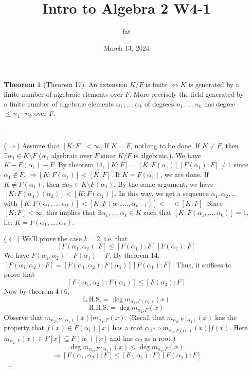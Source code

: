 \documentclass{article}
\title{Intro to Algebra 2 W4-1}
\author{fat}
\date{March 13, 2024}
\theoremstyle{definition}
\newtheorem{thm}{Theorem}
\newenvironment{proofs}[1][\proofname]{%
  \begin{proof}[#1]$ $\par\nobreak\ignorespaces
}{%
  \end{proof}
}
\begin{document}
\maketitle
\thispagestyle{fancy}
\renewcommand{\footrulewidth}{0.4pt}
\cfoot{\thepage}
\renewcommand{\headrulewidth}{0.4pt}

\begin{thm}[Theorem 17]
	An extension $K/F$ is finite $\Leftrightarrow K$ is generated by a finite number of algebraic elements over $F$.
	More precisely the field generated by a finite number of algebraic elements $\alpha_1, ..., \alpha_k$ of degrees $n_1, ..., n_k$ has degree $\leq n_1 \cdots n_k$ over $F$.
\end{thm}

\begin{proofs}
	($\Rightarrow$) Assume that $[K:F] < \infty$.
	If $K = F$, nothing to be done.
	If $K \neq F$, then $\exists \alpha_1 \in K \setminus F$ ($\alpha_1$ algebraic over $F$ since $K/F$ is algebraic.). 
	We have $K - F(\alpha_1) - F$.
	By theorem 14, $[K:F] = [K:F(\alpha_1)][F(\alpha_1):F] \neq 1$ since $\alpha_1 \notin F$.
	$\Rightarrow [K:F(\alpha_1)] < [K:F]$.
	If $K = F(\alpha_1)$, we are done.
	If $K \neq F(\alpha_1)$, then $\exists \alpha_2 \in K \setminus F(\alpha_1)$.
	By the same argument, we have $[K:F(\alpha_1)(\alpha_2)] < [K:F(\alpha_1)]$.
	In this way, we get a sequence $\alpha_1, \alpha_2, ...$ with $[K:F(\alpha_1, ..., \alpha_k)] < [K:F(\alpha_1, ..., \alpha_{k - 1})] < \cdots < [K:F]$.
	Since $[K:F] < \infty$, this implies that $\exists \alpha_1, ..., \alpha_k \in K$ such that $[K:F(\alpha_1, ..., \alpha_k)] = 1$, i.e. $K = F(\alpha_1, ..., \alpha_k)$.
	\par ($\Leftarrow$) We'll prove the case $k = 2$, i.e. that 
	\[
		[F(\alpha_1, \alpha_2):F] \leq [F(\alpha_1):F][F(\alpha_2):F]
	\]
	We have $F(\alpha_1, \alpha_2) - F(\alpha_1) - F$.
	By theorem 14, $[F(\alpha_1, \alpha_2):F] = [F(\alpha_1, \alpha_2):F(\alpha_1)][F(\alpha_1):F]$.
	Thus, it suffices to prove that 
	\[
		[F(\alpha_1, \alpha_2):F(\alpha_1)] \leq [F(\alpha_2):F]
	\]
	Now by theorem 4+6, 
	\[
		\text{L.H.S.} = \deg m_{\alpha_2, F(\alpha_1)}(x)
	\]
	\[
		\text{R.H.S.} = \deg m_{\alpha_2, F}(x)
	\]
	Observe that $m_{\alpha_2, F(\alpha_1)}(x)|m_{\alpha_1, F}(x)$.
	(Recall that $m_{\alpha_2, F(\alpha_1)}(x)$ has the property that $f(x) \in F(\alpha_1)[x]$ has a root $\alpha_2 \Leftrightarrow m_{\alpha_2, F(\alpha_1)}(x)|f(x)$.
	Here $m_{\alpha_2, F}(x) \in F[x] \subseteq F(\alpha_1)[x]$ and has $\alpha_2$ as a root.)
	\[
		\deg m_{\alpha_2, F(\alpha_1)}(x) \leq \deg m_{\alpha_2, F}(x)
	\]
	\[
		\Rightarrow [F(\alpha_1, \alpha_2):F] \leq [F(\alpha_1):F][F(\alpha_2):F]
	\]

\end{proofs}
\end{document}
